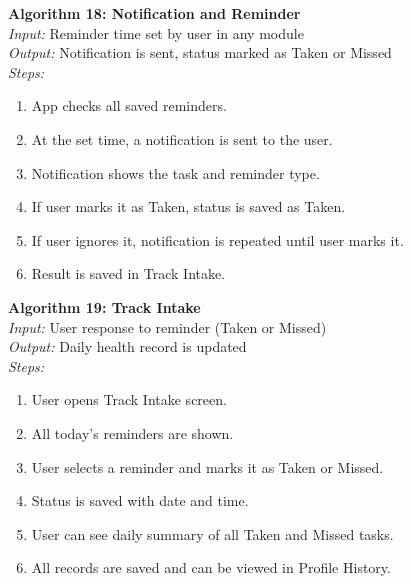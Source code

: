\documentclass[12pt, a4paper, oneside]{report}
\begin{document}
\textbf{Algorithm 18: Notification and Reminder}\\
\textit{Input:} Reminder time set by user in any module\\
\textit{Output:} Notification is sent, status marked as Taken or Missed\\
\textit{Steps:}
\begin{enumerate}
    \item App checks all saved reminders.
    \item At the set time, a notification is sent to the user.
    \item Notification shows the task and reminder type.
    \item If user marks it as Taken, status is saved as Taken.
    \item If user ignores it, notification is repeated until user marks it.
    \item Result is saved in Track Intake.
\end{enumerate}

\textbf{Algorithm 19: Track Intake}\\
\textit{Input:} User response to reminder (Taken or Missed)\\
\textit{Output:} Daily health record is updated\\
\textit{Steps:}
\begin{enumerate}
    \item User opens Track Intake screen.
    \item All today's reminders are shown.
    \item User selects a reminder and marks it as Taken or Missed.
    \item Status is saved with date and time.
    \item User can see daily summary of all Taken and Missed tasks.
    \item All records are saved and can be viewed in Profile History.
\end{enumerate}
\end{document}
